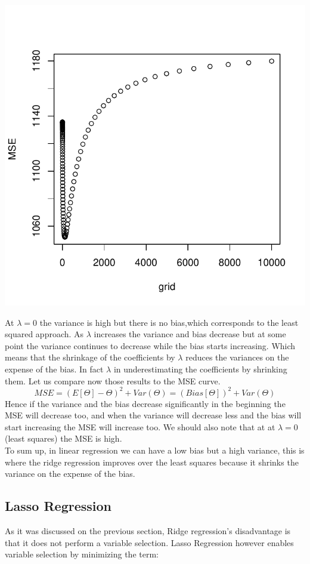 \documentclass[]{report}
\begin{document}
\begin{center}
	\includegraphics[width=0.8\linewidth]{Figures/ridge_mse.pdf}
\end{center}

At $\lambda=0$ the variance is high but there is no bias,which corresponds to the least squared approach.
As $\lambda$ increases the variance and bias decrease but at some point the variance continues to decrease while the bias starts increasing. Which means that the shrinkage of the coefficients by $\lambda$ reduces the variances on the expense of the bias. In fact $\lambda$ in underestimating the coefficients by shrinking them. Let us compare now those results to the MSE curve. 
$$MSE = (E[\varTheta]-\varTheta)^{2} + Var(\varTheta) = (Bias[\varTheta])^{2} + Var(\varTheta)$$
Hence if the variance and the bias decrease significantly in the beginning the MSE will decrease too, and when the variance will decrease less and the bias will start increasing the MSE will increase too. We should also note that at at  $\lambda=0$ (least squares) the MSE is high.\\
To sum up, in linear regression we can have a low bias but a high variance, this is where the ridge regression improves over the least squares because it shrinks the variance on the expense of the bias.

\subsection{Lasso Regression}
As it was discussed on the previous section, Ridge regression's disadvantage is that it does not perform a variable selection. Lasso Regression however enables variable selection by minimizing the term:
\end{document}
